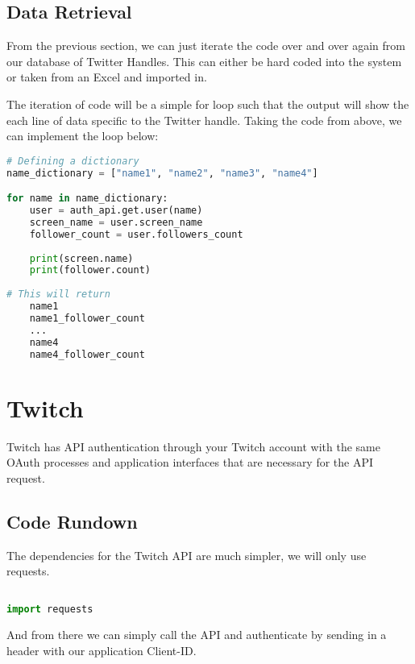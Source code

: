 \documentclass[12pt, letterpaper]{article}
\begin{document}
\subsection{Data Retrieval}
From the previous section, we can just iterate the code over and over again from our database of Twitter Handles. This can either be hard coded into the system or taken from an Excel and imported in.

The iteration of code will be a simple for loop such that the output will show the each line of data specific to the Twitter handle. Taking the code from above, we can implement the loop below:

\begin{lstlisting}[language=python]
# Defining a dictionary
name_dictionary = ["name1", "name2", "name3", "name4"]

for name in name_dictionary:
	user = auth_api.get.user(name)
	screen_name = user.screen_name
	follower_count = user.followers_count
	
	print(screen.name)
	print(follower.count)
	
# This will return
	name1
	name1_follower_count
	...
	name4
	name4_follower_count

\end{lstlisting}

\newpage
\section{Twitch}
Twitch has API authentication through your Twitch account with the same OAuth processes and application interfaces that are necessary for the API request.
\subsection{Code Rundown}
The dependencies for the Twitch API are much simpler, we will only use requests.
\begin{lstlisting}[language=python]

import requests

\end{lstlisting}
And from there we can simply call the API and authenticate by sending in a header with our application Client-ID.
\end{document}
